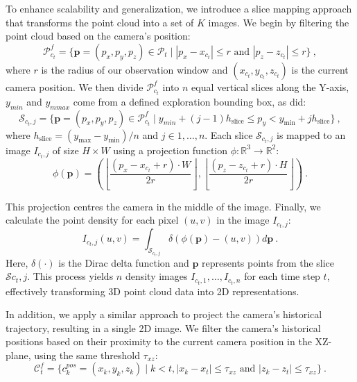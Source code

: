 To enhance scalability and generalization, we introduce a slice mapping approach that transforms the point cloud into a set of $K$ images. We begin by filtering the point cloud based on the camera's position:
%
\begin{equation}
\mathcal{P}_{c_t}^f = \{\mathbf{p} = (p_x, p_y, p_z) \in \mathcal{P}_t \mid |p_x - x_{c_t}| \leq r \text{ and } |p_z - z_{c_t}| \leq r\} \> ,
\end{equation}
%
where $r$ is the radius of our observation window and $(x_{c_t}, y_{c_t}, z_{c_t})$ is the current camera position. We then divide $\mathcal{P}_{c_t}^f$ into $n$ equal vertical slices along the Y-axis, $y_{min}$ and $y_{mmax}$ come from a defined exploration bounding box, as \cite{guedon2023macarons} did:
%
\begin{equation}
\mathcal{S}_{{c_t},j} = \{\mathbf{p} = (p_x, p_y, p_z) \in \mathcal{P}_{c_t}^f \mid y_{min} + (j-1)h_\text{slice} \leq p_y < y_\text{min} + jh_\text{slice}\} \> ,
\end{equation}
%
where $h_\text{slice} = (y_\text{max} - y_\text{min}) / n$ and $j \in {1, \ldots, n}$. Each slice $\mathcal{S}_{{c_t},j}$ is mapped to an image $I_{{c_t},j}$ of size $H \times W$ using a projection function $\phi: \mathbb{R}^3 \to \mathbb{R}^2$:
%
\begin{equation}
\phi(\mathbf{p}) = \left(\left\lfloor\frac{(p_x - x_{c_t} + r) \cdot W}{2r}\right\rfloor, \left\lfloor\frac{(p_z - z_{c_t} + r) \cdot H}{2r}\right\rfloor\right) \> .
\label{projection}
\end{equation}

This projection centres the camera in the middle of the image. Finally, we calculate the point density for each pixel $(u, v)$ in the image $I_{{c_t},j}$:
%
\begin{equation}
I_{{c_t},j}(u, v) = \int_{\mathcal{S}_{{c_t},j}} \delta(\phi(\mathbf{p}) - (u, v)) d\mathbf{p} \> .
\end{equation}
%
Here, $\delta(\cdot)$ is the Dirac delta function and $\mathbf{p}$ represents points from the slice $\mathcal{S}{{c_t},j}$. This process yields $n$ density images ${I_{{c_t},1}, \ldots, I_{{c_t},n}}$ for each time step $t$, effectively transforming 3D point cloud data into 2D representations.

In addition, we apply a similar approach to project the camera's historical trajectory, resulting in a single 2D image. We filter the camera's historical positions based on their proximity to the current camera position in the XZ-plane, using the same threshold $\tau_{xz}$:
%
\begin{equation}
\mathcal{C}_t^f = \{c^{pos}_k = (x_k, y_k, z_k) \mid k < t, |x_k - x_t| \leq \tau_{xz} \text{ and } |z_k - z_t| \leq \tau_{xz}\} \> .
\end{equation}

